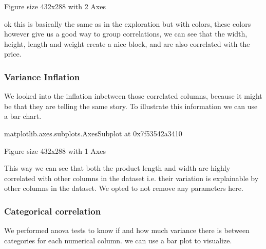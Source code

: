 \documentclass[letterpaper,10pt,english]{jupyterBook}
\begin{document}
\begin{sphinxVerbatim}[commandchars=\\\{\}]
\PYGZlt{}Figure size 432x288 with 2 Axes\PYGZgt{}
\end{sphinxVerbatim}

\sphinxAtStartPar
ok this is basically the same as in the exploration but with colors, these colors however give us a good way to group correlations, we can see that the width, height, length and weight create a nice block, and are also correlated with the price.


\subsubsection{Variance Inflation}
\label{\detokenize{c7_case_studies/Olist:id5}}
\sphinxAtStartPar
We looked into the inflation inbetween those correlated columns, because it might be that they are telling the same story. To illustrate this information we can use a bar chart.

\begin{sphinxVerbatim}[commandchars=\\\{\}]
\end{sphinxVerbatim}

\begin{sphinxVerbatim}[commandchars=\\\{\}]
\PYGZlt{}matplotlib.axes.\PYGZus{}subplots.AxesSubplot at 0x7f53542a3410\PYGZgt{}
\end{sphinxVerbatim}

\begin{sphinxVerbatim}[commandchars=\\\{\}]
\PYGZlt{}Figure size 432x288 with 1 Axes\PYGZgt{}
\end{sphinxVerbatim}

\sphinxAtStartPar
This way we can see that both the product length and width are highly correlated with other columns in the dataset i.e. their variation is explainable by other columns in the dataset. We opted to not remove any parameters here.


\subsubsection{Categorical correlation}
\label{\detokenize{c7_case_studies/Olist:id6}}
\sphinxAtStartPar
We performed anova tests to know if and how much variance there is between categories for each numerical column. we can use a bar plot to visualize.
\end{document}
